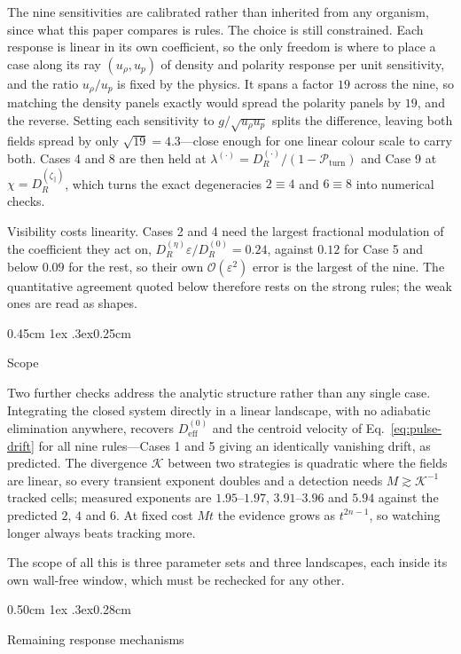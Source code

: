 \documentclass[
  reprint,
  superscriptaddress,
  amsmath,
  amssymb,
  aps,
  pre,
  nofootinbib,
  floatfix
]{revtex4-2}
\makeatletter
\newcommand{\ord}{\mathcal O}
\newcommand{\Pturn}{\mathcal P_{\mathrm{turn}}}
\newcommand{\zp}{\zeta_\parallel}
\def\section{\@startsection{section}{1}{\z@}%
  {0.50cm \@plus1ex \@minus.3ex}{0.28cm}%
  {\normalfont\small\bfseries\raggedright}}%
\def\subsection{\@startsection{subsection}{2}{\z@}%
  {0.45cm \@plus1ex \@minus.3ex}{0.25cm}%
  {\normalfont\small\bfseries\raggedright}}%
\makeatother
\begin{document}
The nine sensitivities are calibrated rather than inherited from any organism,
since what this paper compares is rules.  The choice is still constrained.
Each response is linear in its own coefficient, so the only freedom is where
to place a case along its ray $(u_\rho,u_p)$ of density and polarity response
per unit sensitivity, and the ratio $u_\rho/u_p$ is fixed by the physics.  It
spans a factor $19$ across the nine, so matching the density panels exactly
would spread the polarity panels by $19$, and the reverse.  Setting each
sensitivity to $g/\sqrt{u_\rho u_p}$ splits the difference, leaving both
fields spread by only $\sqrt{19}=4.3$---close enough for one linear colour
scale to carry both.  Cases 4 and 8 are then held at
$\lambda^{(\cdot)}=D_R^{(\cdot)}/(1-\Pturn)$ and Case 9 at
$\chi=D_R^{(\zp)}$, which turns the exact degeneracies $2\!\equiv\!4$ and
$6\!\equiv\!8$ into numerical checks.

Visibility costs linearity.  Cases 2 and 4 need the largest fractional
modulation of the coefficient they act on, $D_R^{(\eta)}\varepsilon/D_R^{(0)}=0.24$,
against $0.12$ for Case 5 and below $0.09$ for the rest, so their own
$\ord(\varepsilon^{2})$ error is the largest of the nine.  The quantitative
agreement quoted below therefore rests on the strong rules; the weak ones are
read as shapes.

\subsection{Scope}


Two further checks address the analytic structure rather than any single case.
Integrating the closed system directly in a linear landscape, with no
adiabatic elimination anywhere, recovers $D_{\mathrm{eff}}^{(0)}$ and the
centroid velocity of Eq.~\eqref{eq:pulse-drift} for all nine rules---Cases 1
and 5 giving an identically vanishing drift, as predicted.  The divergence
$\mathcal K$ between two strategies is quadratic where the fields are linear,
so every transient exponent doubles and a detection needs
$M\gtrsim\mathcal K^{-1}$ tracked cells; measured exponents are
$1.95$--$1.97$, $3.91$--$3.96$ and $5.94$ against the predicted $2$, $4$
and $6$.  At fixed cost $Mt$ the evidence grows as $t^{2n-1}$, so watching
longer always beats tracking more.

The scope of all this is three parameter sets and three landscapes, each
inside its own wall-free window, which must be rechecked for any other.

\section{Remaining response mechanisms}
\label{app:remaining-cases}
\end{document}
